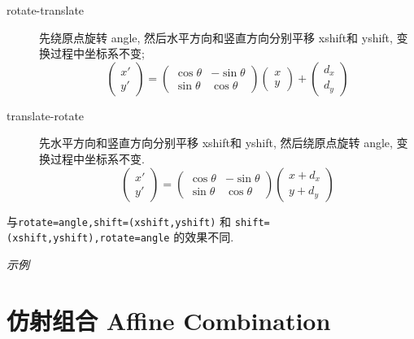 \begin{description}
  \item[rotate-translate] 先绕原点旋转 angle, 然后水平方向和竖直方向分别平移 xshift和 yshift, 变换过程中坐标系不变;
  \[
    \begin{pmatrix}
      x'\\
      y'
    \end{pmatrix}
    =
    \begin{pmatrix}
      \cos\theta & -\sin\theta\\
      \sin\theta & \cos\theta
    \end{pmatrix}
    \begin{pmatrix}
      x\\
      y
    \end{pmatrix}
    +
    \begin{pmatrix}
      d_x\\
      d_y
    \end{pmatrix}
  \]
  \item[translate-rotate] 先水平方向和竖直方向分别平移 xshift和 yshift, 然后绕原点旋转 angle, 变换过程中坐标系不变.
  \[
    \begin{pmatrix}
      x'\\
      y'
    \end{pmatrix}
    =
    \begin{pmatrix}
      \cos\theta & -\sin\theta\\
      \sin\theta & \cos\theta
    \end{pmatrix}
    \begin{pmatrix}
      x+d_x\\
      y+d_y
    \end{pmatrix}
  \]
\end{description}

\begin{remark*}
  与\texttt{rotate=angle,shift={(xshift,yshift)}} 和 \texttt{shift={(xshift,yshift)},rotate=angle}
的效果不同.
\end{remark*}

\emph{示例}



\section{仿射组合 Affine Combination}

